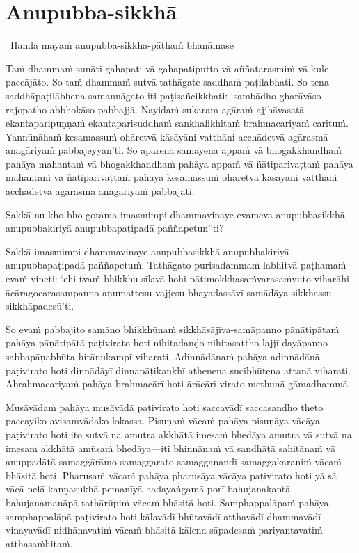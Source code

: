 \suttaRef{[SN 56.11]}


\section{Anupubba-sikkhā}

\begin{leader}
  \anglebracketleft\ \hspace{-0.5mm}Handa mayaṁ anupubba-sikkha-pāṭhaṁ bhaṇāmase \hspace{-0.5mm}\anglebracketright\
\end{leader}

Taṁ dhammaṁ suṇāti gahapati vā gahapatiputto vā aññatarasmiṁ vā kule paccājāto. So taṁ dhammaṁ sutvā tathāgate saddhaṁ paṭilabhati. So tena saddhāpaṭilābhena samannāgato iti paṭisañcikkhati: `sambādho gharāvāso rajopatho abbhokāso pabbajjā. Nayidaṁ sukaraṁ agāraṁ ajjhāvasatā ekantaparipuṇṇaṁ ekantaparisuddhaṁ sankhalikhitaṁ brahmacariyaṁ carituṁ. Yannūnāhaṁ kesamassuṁ ohāretvā kāsāyāni vatthāni acchādetvā agārasmā anagāriyaṁ pabbajeyyan'ti. So aparena samayena appaṁ vā bhogakkhandhaṁ pahāya mahantaṁ vā bhogakkhandhaṁ pahāya appaṁ vā ñātiparivaṭṭaṁ pahāya mahantaṁ vā ñātiparivaṭṭaṁ pahāya kesamassuṁ ohāretvā kāsāyāni vatthāni acchādetvā agārasmā anagāriyaṁ pabbajati.

\suttaRef{[MN 27 / 38 / 51]}

Sakkā nu kho bho gotama imasmimpi dhammavinaye evameva anupubbasikkhā anupubbakiriyā anupubbapaṭipadā paññapetun''ti?

Sakkā imasmimpi dhammavinaye anupubbasikkhā anupubbakiriyā anupubbapaṭipadā paññapetuṁ. Tathāgato purisadammaṁ labhitvā paṭhamaṁ evaṁ vineti: `ehi tvaṁ bhikkhu sīlavā hohi pātimokkhasaṁvarasaṁvuto viharāhi ācāragocarasampanno aṇumattesu vajjesu bhayadassāvī samādāya sikkhassu sikkhāpadesū'ti.

\suttaRef{[MN 107]}

So evaṁ pabbajito samāno bhikkhūnaṁ sikkhāsājīva-samāpanno pāṇātipātaṁ pahāya pāṇātipātā paṭivirato hoti nihitadaṇḍo nihitasattho lajjī dayāpanno sabbapāṇabhūta-hitānukampī viharati. Adinnādānaṁ pahāya adinnādānā paṭivirato hoti dinnādāyī dinnapāṭikankhī athenena sucibhūtena attanā viharati. Abrahmacariyaṁ pahāya brahmacārī hoti ārācārī virato methunā gāmadhammā.

Musāvādaṁ pahāya musāvādā paṭivirato hoti saccavādī saccasandho theto paccayiko avisaṁvādako lokassa. Pisuṇaṁ vācaṁ pahāya pisuṇāya vācāya paṭivirato hoti ito sutvā na amutra akkhātā imesaṁ bhedāya amutra vā sutvā na imesaṁ akkhātā amūsaṁ bhedāya—iti bhinnānaṁ vā sandhātā sahitānaṁ vā anuppadātā samaggārāmo samaggarato samagganandī samaggakaraṇiṁ vācaṁ bhāsitā hoti. Pharusaṁ vācaṁ pahāya pharusāya vācāya paṭivirato hoti yā sā vācā nelā kaṇṇasukhā pemanīyā hadayaṅgamā porī bahujanakantā bahujanamanāpā tathārūpiṁ vācaṁ bhāsitā hoti. Samphappalāpaṁ pahāya samphappalāpā paṭivirato hoti kālavādī bhūtavādī atthavādī dhammavādī vinayavādī nidhānavatiṁ vācaṁ bhāsitā kālena sāpadesaṁ pariyantavatiṁ atthasaṁhitaṁ.

